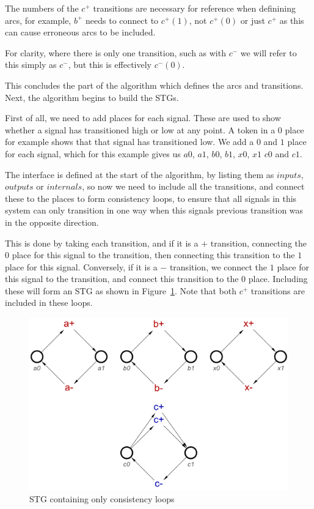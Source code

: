 \documentclass[british,conference,compsoc]{IEEEtran}
\begin{document}
The numbers of the $c^{+}$ transitions are necessary for reference
when definining arcs, for example, $b^{+}$ needs to connect to 
$c^{+}(1)$, not $c^{+}(0)$ or just $c^{+}$ as this can cause 
erroneous arcs to be included. 

For clarity, where there is only one transition, such as with $c^{-}$
we will refer to this simply as $c^{-}$, but this is effectively $c^{-}(0)$.

This concludes the part of the algorithm which defines the arcs
and transitions. Next, the algorithm begins to build the STGs. 

First of all, we need to add places for each signal. These are used to
show whether a signal has transitioned high or low at any point. 
A token in a $0$ place for example shows that that signal has 
transitioned low. We add a $0$ and $1$ place for each signal, 
which for this example gives us $a0$, $a1$, $b0$, $b1$, $x0$, $x1$
$c0$ and $c1$.

The interface is defined at the start of the algorithm, by listing them as 
$inputs$, $outputs$ or $internals$, so now we need to include all the 
transitions, and connect these to the places to form consistency loops, to 
ensure that all signals in this system can only transition in one way when this 
signals previous transition was in the opposite direction. 

This is done by taking each transition, and if it is a $+$ transition, 
connecting the $0$ place for this signal to the transition, then connecting 
this transition to the $1$ place for this signal. Conversely, if it is a $-$ 
transition, we connect the $1$ place for this signal to the transition, and 
connect this transition to the $0$ place. Including these will form an STG as 
shown in Figure~\ref{fig:loops}. Note that both $c^{+}$ transitions are 
included in these loops.

\begin{figure}[h]
\begin{centering}
\includegraphics[scale=0.25]{Images/or-gate-ctrl-loops-stg}
\par\end{centering}
\protect\caption{\label{fig:loops} STG containing only consistency loops}
\end{figure}
\end{document}
